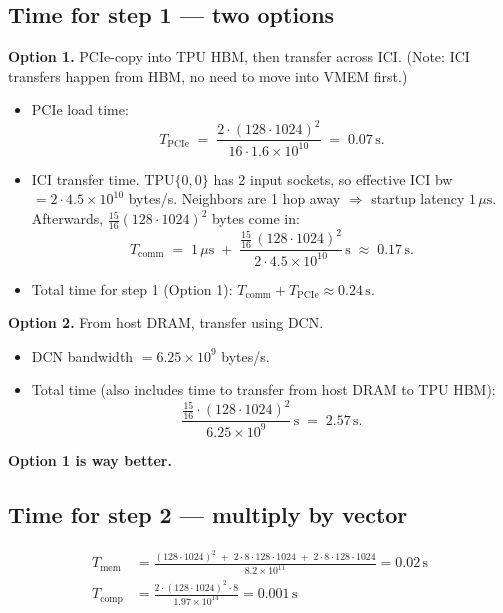 \documentclass[11pt]{article}
\newcommand{\Tmem}{T_{\text{mem}}}
\newcommand{\Tcomm}{T_{\text{comm}}}
\newcommand{\Tcomp}{T_{\text{comp}}}
\newcommand{\TPCIe}{T_{\text{PCIe}}}
\begin{document}
\subsection*{Time for step 1 --- two options}

\textbf{Option 1.} PCIe-copy into TPU HBM, then transfer across ICI. (Note: ICI transfers happen from HBM, no need to move into VMEM first.)

\begin{itemize}[leftmargin=*]
  \item PCIe load time:
  \[
  \TPCIe \;=\; \frac{2 \cdot (128 \cdot 1024)^2}{16 \cdot 1.6 \times 10^{10}} \;=\; 0.07\,\text{s}.
  \]
  \item ICI transfer time. $\text{TPU}\{0,0\}$ has 2 input sockets, so effective ICI bw $= 2 \cdot 4.5 \times 10^{10}$ bytes/s. Neighbors are 1 hop away $\Rightarrow$ startup latency $1\,\mu\text{s}$. Afterwards, $\tfrac{15}{16}(128 \cdot 1024)^2$ bytes come in:
  \[
  \Tcomm \;=\; 1\,\mu\text{s} \;+\; \frac{\tfrac{15}{16}\,(128 \cdot 1024)^2}{2 \cdot 4.5 \times 10^{10}}\,\text{s} \;\approx\; 0.17\,\text{s}.
  \]
  \item Total time for step 1 (Option 1): $\Tcomm + \TPCIe \approx 0.24\,\text{s}$.
\end{itemize}

\textbf{Option 2.} From host DRAM, transfer using DCN.

\begin{itemize}[leftmargin=*]
  \item DCN bandwidth $= 6.25 \times 10^9$ bytes/s.
  \item Total time (also includes time to transfer from host DRAM to TPU HBM):
  \[
  \frac{\tfrac{15}{16} \cdot (128 \cdot 1024)^2}{6.25 \times 10^9} \,\text{s} \;=\; 2.57\,\text{s}.
  \]
\end{itemize}

\textbf{Option 1 is way better.}

\subsection*{Time for step 2 --- multiply by vector}
\begin{align*}
\Tmem  &= \frac{(128 \cdot 1024)^2 \;+\; 2 \cdot 8 \cdot 128 \cdot 1024 \;+\; 2 \cdot 8 \cdot 128 \cdot 1024}{8.2 \times 10^{11}} = 0.02\,\text{s} \\
\Tcomp &= \frac{2 \cdot (128 \cdot 1024)^2 \cdot 8}{1.97 \times 10^{14}} = 0.001\,\text{s}
\end{align*}
\end{document}
